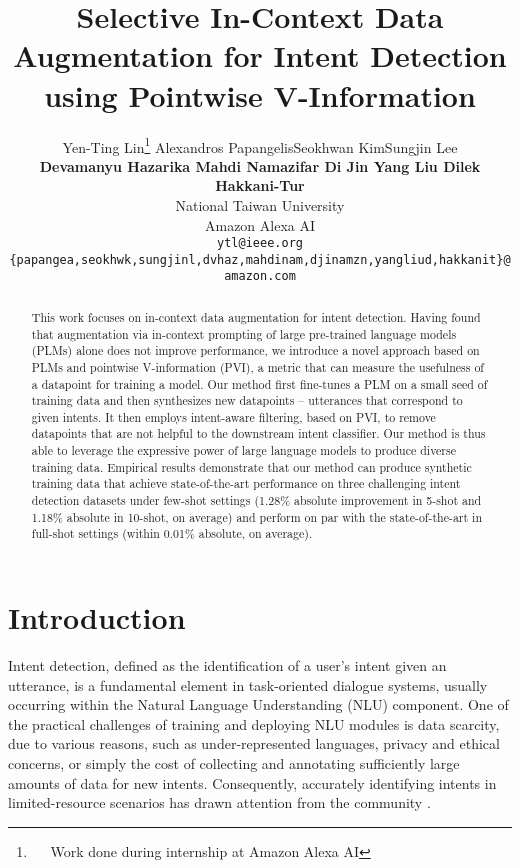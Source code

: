 \documentclass[11pt]{article}
\title{Selective In-Context Data Augmentation for Intent Detection using Pointwise V-Information}
\author{
Yen-Ting Lin\thanks{~~ Work done during internship at Amazon Alexa AI} \quad Alexandros Papangelis\quad Seokhwan Kim\quad Sungjin Lee \\
\textbf{Devamanyu Hazarika \quad Mahdi Namazifar \quad Di Jin \quad Yang Liu \quad Dilek Hakkani-Tur}\\
  National Taiwan University \\
  Amazon Alexa AI \\
  \small\texttt{ytl@ieee.org} \quad  \texttt{\{papangea,seokhwk,sungjinl,dvhaz,mahdinam,djinamzn,yangliud,hakkanit\}@amazon.com} \\
}
\begin{document}
\maketitle
\begin{abstract}
This work focuses on in-context data augmentation for intent detection. Having found that augmentation via in-context prompting of large pre-trained language models (PLMs) alone does not improve performance, we introduce a novel approach based on PLMs and pointwise V-information (PVI), a metric that can measure the usefulness of a datapoint for training a model.
Our method first fine-tunes a PLM on a small seed of training data and then synthesizes new datapoints -- utterances that correspond to given intents.
It then employs intent-aware filtering, based on PVI, to remove datapoints that are not helpful to the downstream intent classifier. Our method is thus able to leverage the expressive power of large language models to produce diverse training data. 
Empirical results demonstrate that our method can produce synthetic training data that achieve state-of-the-art performance on three challenging intent detection datasets under few-shot settings (1.28\% absolute improvement in 5-shot and 1.18\% absolute in 10-shot, on average) and perform on par with the state-of-the-art in full-shot settings (within 0.01\% absolute, on average).
\end{abstract}

\section{Introduction}
Intent detection, defined as the identification of a user's intent given an utterance, is a fundamental element in task-oriented dialogue systems, usually occurring within the Natural Language Understanding (NLU) component.
One of the practical challenges of training and deploying NLU modules is data scarcity, due to various reasons, such as under-represented languages, privacy and ethical concerns, or simply the cost of collecting and annotating sufficiently large amounts of data for new intents. 
Consequently, accurately identifying intents in limited-resource scenarios has drawn attention from the community \cite[for example]{papangelis-etal-2021-generative,mehri-eric-2021-example,zhang-etal-2021-shot}. 
\end{document}
